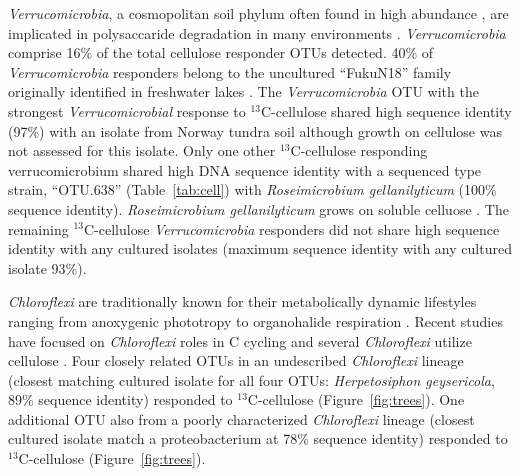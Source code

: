 \textit{Verrucomicrobia}, a cosmopolitan soil phylum often found in high
abundance \citep{Fierer_2013}, are implicated in polysaccaride degradation in
many environments \citep{Fierer_2013,Herlemann_2013,10543821}.
\textit{Verrucomicrobia} comprise 16\% of the total cellulose responder OTUs
detected. 40\% of \textit{Verrucomicrobia} responders belong to the uncultured
``FukuN18'' family originally identified in freshwater lakes
\citep{Parveen_2013}.  The \textit{Verrucomicrobia} OTU with the strongest
\textit{Verrucomicrobial} response to $^{13}$C-cellulose shared high sequence
identity (97\%) with an isolate from Norway tundra soil \citep{Jiang_2011}
although growth on cellulose was not assessed for this isolate. Only one other
$^{13}$C-cellulose responding verrucomicrobium shared high DNA sequence
identity with a sequenced type strain, ``OTU.638'' (Table~\ref{tab:cell}) with
\textit{Roseimicrobium gellanilyticum} (100\% sequence identity).
\textit{Roseimicrobium gellanilyticum} grows on soluble celluose
\citep{Otsuka_2012}. The remaining $^{13}$C-cellulose \textit{Verrucomicrobia}
responders did not share high sequence identity with any cultured isolates
(maximum sequence identity with any cultured isolate 93\%). 

\textit{Chloroflexi} are traditionally known for their metabolically dynamic
lifestyles ranging from anoxygenic phototropy to organohalide respiration
\citep{Hug_2013}. Recent studies have focused on \textit{Chloroflexi} roles in
C cycling \citep{Hug_2013, Goldfarb_2011,Cole_2013} and several \textit{Chloroflexi} utilize cellulose \citep{Goldfarb_2011, Cole_2013,
Hug_2013}. Four closely related OTUs in an undescribed \textit{Chloroflexi}
lineage (closest matching cultured isolate for all four OTUs:
\textit{Herpetosiphon geysericola}, 89\% sequence identity) responded to
$^{13}$C-cellulose (Figure~\ref{fig:trees}). One additional OTU also from a
poorly characterized \textit{Chloroflexi} lineage (closest cultured isolate match a proteobacterium
at 78\% sequence identity) responded to $^{13}$C-cellulose
(Figure~\ref{fig:trees}).

